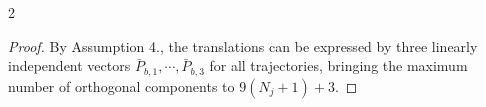 \documentclass{article}
\newtheorem{proof}{Proof}[theorem]
\begin{document}
\begin{multicols}{2}
\begin{proof}
    By Assumption 4., the translations can be expressed by three linearly independent vectors $\bar{P}_{b,1},\cdots, \bar{P}_{b,3}$ for all trajectories, bringing the maximum number of orthogonal components to $9(N_j+1)+3$. 








\end{proof}
\end{multicols}
\end{document}
